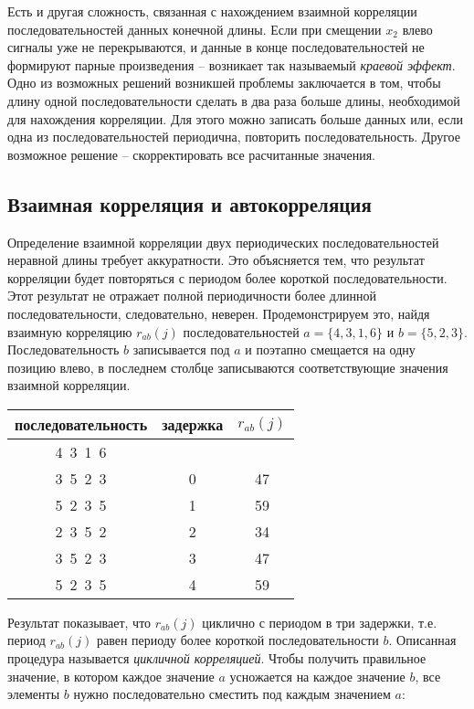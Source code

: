\documentclass{article}
\begin{document}
\noindent Есть и другая сложность, связанная с нахождением взаимной корреляции последовательностей данных конечной длины. Если при смещении $x_2$ влево сигналы уже не перекрываются, и данные в конце последовательностей не формируют парные произведения -- возникает так называемый \textit{краевой эффект}. Одно из возможных решений возникшей проблемы заключается в том, чтобы длину одной последовательности сделать в два раза больше длины, необходимой для нахождения корреляции. Для этого можно записать больше данных или, если одна из последовательностей периодична, повторить последовательность. Другое возможное решение -- скорректировать все расчитанные значения.

\subsection{Взаимная корреляция и автокорреляция}
\noindent Определение взаимной корреляции двух периодических последовательностей неравной длины требует аккуратности. Это объясняется тем, что результат корреляции будет повторяться с периодом более короткой последовательности. Этот результат не отражает полной периодичности более длинной последовательности, следовательно, неверен. Продемонстрируем это, найдя взаимную корреляцию $r_{ab}(j)$ последовательностей $a = \{4, 3, 1, 6\}$ и $b = \{5, 2, 3\}$. Последовательность $b$ записывается под $a$ и поэтапно смещается на одну позицию влево, в последнем столбце записываются соответствующие значения взаимной корреляции.
\begin{table}[H]
    \centering
    \begin{tabular}{|c|c|c|}
    \hline 
         последовательность & задержка & $r_{ab}(j)$  \\
         \hline \hline
         4~3~1~6 & & \\
         \hline
         3~5~2~3 & 0 & 47\\ \hline
         5~2~3~5 & 1 & 59\\ \hline
         2~3~5~2 & 2& 34\\ \hline
         3~5~2~3 & 3 & 47\\ \hline
         5~2~3~5 & 4 & 59\\ 
     \hline    
    \end{tabular}
    \label{tab:my_label}
\end{table}
\noindent Результат показывает, что $r_{ab}(j)$ циклично с периодом в три задержки, т.е. период $r_{ab}(j)$ равен периоду более короткой последовательности $b$. Описанная процедура называется \textit{цикличной корреляцией}. Чтобы получить правильное значение, в котором каждое значение $a$ усножается на каждое значение $b$, все элементы $b$ нужно последовательно сместить под каждым значением $a$: 
\end{document}
